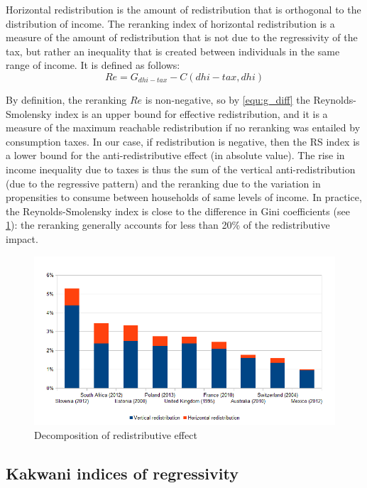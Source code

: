 Horizontal redistribution is the amount of redistribution that is orthogonal to the distribution of income. The reranking index of horizontal redistribution is a measure of the amount of redistribution that is not due to the regressivity of the tax, but rather an inequality that is created between individuals in the same range of income. It is defined as follows:
\[ Re = G_{dhi-tax} - C(dhi-tax,dhi) \]

By definition, the reranking $Re$ is non-negative, so by \cref{equ:g_diff} the Reynolds-Smolensky index is an upper bound for effective redistribution, and it is a measure of the maximum reachable redistribution if no reranking was entailed by consumption taxes. In our case, if redistribution is negative, then the RS index is a lower bound for the anti-redistributive effect (in absolute value). The rise in income inequality due to taxes is thus the sum of the vertical anti-redistribution (due to the regressive pattern) and the reranking due to the variation in propensities to consume between households of same levels of income. In practice, the Reynolds-Smolensky index is close to the difference in Gini coefficients (see \cref{fig:reranking}): the reranking generally accounts for less than 20\% of the redistributive impact. 

\begin{figure}
    \centering
    \includegraphics[width=\textwidth]{images/19-02_decomposition_effective_redistribution}
    \caption{Decomposition of redistributive effect}
    \label{fig:reranking}
\end{figure}


\subsection{Kakwani indices of regressivity}
\label{sec:kakwani}

